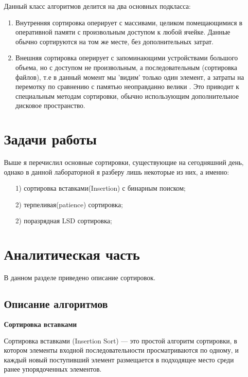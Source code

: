 \documentclass[a4paper, 14pt]{article}
\begin{document}
Данный класс алгоритмов делится на два основных подкласса:
\begin{enumerate}
\item Внутренняя сортировка оперирует с массивами, целиком помещающимися в оперативной памяти с произвольным доступом к любой ячейке. Данные обычно сортируются на том же месте, без дополнительных затрат.

\item Внешняя сортировка оперирует с запоминающими устройствами большого объема, но с доступом не произвольным, а последовательным (сортировка файлов), т.е в данный момент мы 'видим' только один элемент, а затраты на перемотку по сравнению с памятью неоправданно велики . Это приводит к специальным методам сортировки, обычно использующим дополнительное дисковое пространство.
\end{enumerate}

\newpage
\section*{Задачи работы}

Выше я перечислил основные сортировки, существующие на сегодняшний день, однако в данной лабораторной я разберу лишь некоторые из них, а именно:

\begin{enumerate}
\item[1)] сортировка вставками(Insertion) с бинарным поиском;
\item[2)] терпеливая(patience) сортировка;
\item[2)] поразрядная LSD сортировка;
\end{enumerate}


\newpage
\section{Аналитическая часть}
\hspace{1cm}	В данном разделе приведено описание сортировок.
\subsection{Описание алгоритмов}
\begin{doublespace}

\large
\textbf{Сортировка вставками}
\normalsize
\end{doublespace}
Сортировка вставками (Insertion Sort) — это простой алгоритм сортировки, в котором элементы входной последовательности просматриваются по одному, и каждый новый поступивший элемент размещается в подходящее место среди ранее упорядоченных элементов. \cite{knut}
\end{document}
